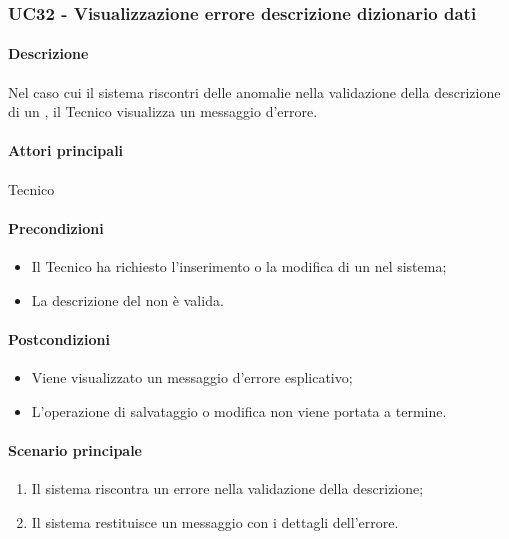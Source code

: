 \subsubsection{UC32 - Visualizzazione errore descrizione dizionario dati}\label{UC32}
\paragraph*{Descrizione}
Nel caso cui il sistema riscontri delle anomalie nella validazione della descrizione di un , il Tecnico visualizza un messaggio d'errore.

\paragraph*{Attori principali}
Tecnico

\paragraph*{Precondizioni}
\begin{itemize}
  \item Il Tecnico ha richiesto l'inserimento o la modifica di un  nel sistema;
  \item La descrizione del  non è valida.
\end{itemize}

\paragraph*{Postcondizioni}
\begin{itemize}
  \item Viene visualizzato un messaggio d'errore esplicativo;
  \item L'operazione di salvataggio o modifica non viene portata a termine.
\end{itemize}

\paragraph*{Scenario principale}
\begin{enumerate}
  \item Il sistema riscontra un errore nella validazione della descrizione;
  \item Il sistema restituisce un messaggio con i dettagli dell'errore.  
\end{enumerate}